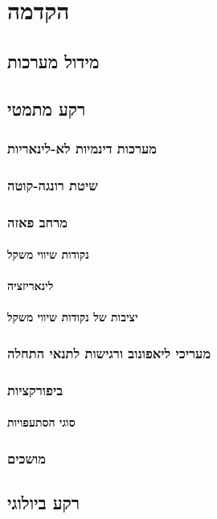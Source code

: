 \documentclass{article}
\begin{document}
\setcounter{page}{1}
\section{הקדמה}
\subsection{מידול מערכות}
\subsection{רקע מתמטי}
\subsubsection{מערכות דינמיות לא-לינאריות}
\subsubsection{שיטת רונגה-קוטה}
\subsubsection{מרחב פאזה}
\paragraph{נקודות שיווי משקל}
\paragraph{לינאריזציה}
\paragraph{יציבות של נקודות שיווי משקל}
\subsubsection{מעריכי ליאפונוב ורגישות לתנאי התחלה}
\subsubsection{ביפורקציות}
\paragraph{סוגי הסתעפויות}
\subsubsection{מושכים}
\subsection{רקע ביולוגי}
\end{document}
